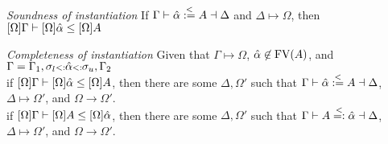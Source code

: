 \documentclass{sig-alternate}
\begin{document}
\emph{Soundness of instantiation} If $\Gamma \vdash \hat{\alpha}\overset{<}{:=} A \dashv\Delta$ and $\Delta \mapsto \Omega$, then $[\Omega]\Gamma \vdash [\Omega]\hat{\alpha} \leq [\Omega]A$

\emph{Completeness of instantiation} 
Given that $\Gamma \longmapsto \Omega$, $\hat{\alpha}\not\in \text{FV}(A)$, and $\Gamma = \Gamma_1,\sigma_l {\scriptstyle{<:}} \hat{\alpha} {\scriptstyle{<:}} \sigma_u,\Gamma_2$\\
if $[\Omega]\Gamma\vdash [\Omega]\hat{\alpha} \leq [\Omega]A$, then there are some $\Delta,\Omega'$ such that $\Gamma \vdash \hat{\alpha} \overset{<}{:=} A \dashv \Delta$, $\Delta \longmapsto \Omega'$, and $\Omega \longrightarrow \Omega'$.\\
if $[\Omega]\Gamma\vdash [\Omega]A \leq [\Omega]\hat{\alpha}$, then there are some $\Delta,\Omega'$ such that $\Gamma \vdash A \overset{<}{=:} \hat{\alpha} \dashv \Delta$, $\Delta \longmapsto \Omega'$, and $\Omega \longrightarrow \Omega'$.
\end{document}
